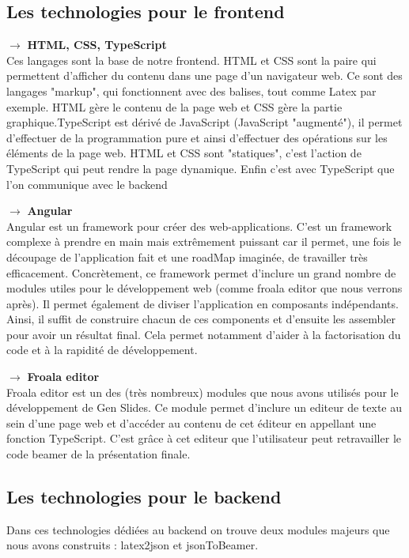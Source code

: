 \documentclass[12pt]{article}
\begin{document}
\subsection{Les technologies pour le frontend}
\noindent
$\longrightarrow$ \textbf{HTML, CSS, TypeScript}\\
Ces langages sont la base de notre frontend. HTML et CSS sont la paire qui permettent d'afficher du contenu dans une page d'un navigateur web. Ce sont des langages "markup", qui fonctionnent avec des balises, tout comme Latex par exemple. HTML gère le contenu de la page web et CSS gère la partie graphique.TypeScript est dérivé de JavaScript (JavaScript "augmenté"), il permet d'effectuer de la programmation pure et ainsi d'effectuer des opérations sur les éléments de la page web. HTML et CSS sont "statiques", c'est l'action de TypeScript qui peut rendre la page dynamique. Enfin c'est avec TypeScript que l'on communique avec le backend

\noindent
$\longrightarrow$ \textbf{Angular}\\
Angular est un framework pour créer des web-applications. C'est un framework complexe à prendre en main mais extrêmement puissant car il permet, une fois le découpage de l'application fait et une roadMap imaginée, de travailler très efficacement. Concrètement, ce framework permet d'inclure un grand nombre de modules utiles pour le développement web (comme froala editor que nous verrons après). Il permet également de diviser l'application en composants indépendants. Ainsi, il suffit de construire chacun de ces components et d'ensuite les assembler pour avoir un résultat final. Cela permet notamment d'aider à la factorisation du code et à la rapidité de développement.

\noindent
$\longrightarrow$ \textbf{Froala editor}\\
Froala editor est un des (très nombreux) modules que nous avons utilisés pour le développement de Gen Slides. Ce module permet d'inclure un editeur de texte au sein d'une page web et d'accéder au contenu de cet éditeur en appellant une fonction TypeScript. C'est grâce à cet editeur que l'utilisateur peut retravailler le code beamer de la présentation finale. 

\subsection{Les technologies pour le backend}
Dans ces technologies dédiées au backend on trouve deux modules majeurs que nous avons construits : latex2json et jsonToBeamer.
\end{document}
